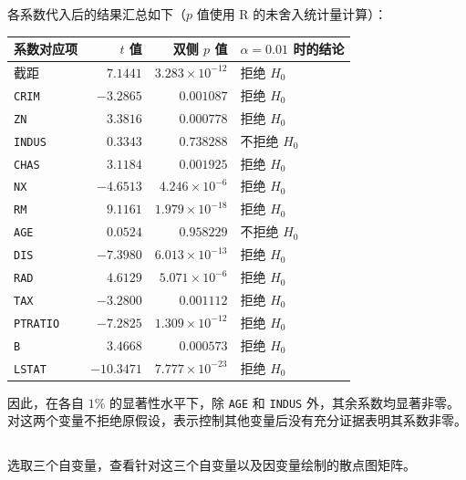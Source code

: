 \documentclass[12pt,a4paper]{article}
\begin{document}
\begin{answerbox}
各系数代入后的结果汇总如下（$p$ 值使用 R 的未舍入统计量计算）：
\begin{center}
\small
\begin{tabular}{lrrl}
\toprule
系数对应项 & $t$ 值 & 双侧 $p$ 值 & $\alpha=0.01$ 时的结论 \\
\midrule
截距 & $7.1441$ & $3.283\times10^{-12}$ & 拒绝 $H_0$ \\
\texttt{CRIM} & $-3.2865$ & $0.001087$ & 拒绝 $H_0$ \\
\texttt{ZN} & $3.3816$ & $0.000778$ & 拒绝 $H_0$ \\
\texttt{INDUS} & $0.3343$ & $0.738288$ & 不拒绝 $H_0$ \\
\texttt{CHAS} & $3.1184$ & $0.001925$ & 拒绝 $H_0$ \\
\texttt{NX} & $-4.6513$ & $4.246\times10^{-6}$ & 拒绝 $H_0$ \\
\texttt{RM} & $9.1161$ & $1.979\times10^{-18}$ & 拒绝 $H_0$ \\
\texttt{AGE} & $0.0524$ & $0.958229$ & 不拒绝 $H_0$ \\
\texttt{DIS} & $-7.3980$ & $6.013\times10^{-13}$ & 拒绝 $H_0$ \\
\texttt{RAD} & $4.6129$ & $5.071\times10^{-6}$ & 拒绝 $H_0$ \\
\texttt{TAX} & $-3.2800$ & $0.001112$ & 拒绝 $H_0$ \\
\texttt{PTRATIO} & $-7.2825$ & $1.309\times10^{-12}$ & 拒绝 $H_0$ \\
\texttt{B} & $3.4668$ & $0.000573$ & 拒绝 $H_0$ \\
\texttt{LSTAT} & $-10.3471$ & $7.777\times10^{-23}$ & 拒绝 $H_0$ \\
\bottomrule
\end{tabular}
\end{center}

因此，在各自 $1\%$ 的显著性水平下，除 \texttt{AGE} 和 \texttt{INDUS} 外，其余系数均显著非零。对这两个变量不拒绝原假设，表示控制其他变量后没有充分证据表明其系数非零。

\end{answerbox}

\subsection{}

选取三个自变量，查看针对这三个自变量以及因变量绘制的散点图矩阵。
\end{document}
